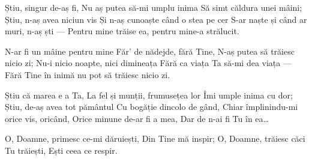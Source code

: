 \beginverse
Știu, singur de-aș fi,
Nu aș putea să-mi umplu inima
Să simt căldura unei mâini;
Știu, n-aș avea niciun vis
Și n-aș cunoaște când o stea pe cer
S-ar naște și când ar muri, n-aș ști —
Pentru mine trăise ea, pentru mine-a strălucit.
\endverse

\beginchorus
N-ar fi un mâine pentru mine
Făr’ de nădejde, fără Tine,
N-aș putea să trăiesc nicio zi;
Nu-i nicio noapte, nici dimineața
Fără ca viața Ta să-mi dea viața —
Fără Tine în inimă nu pot să trăiesc nicio zi.
\endchorus

\beginverse
Știu că marea e a Ta,
La fel și munții, frumusețea lor
Îmi umple inima cu dor;
Știu, de-aș avea tot pământul
Cu bogăție dincolo de gând,
Chiar împlinindu-mi orice vis, oricând,
Orice minune de-ar fi a mea,
Dar de n-ai fi Tu în ea…
\endverse

\beginverse*
O, Doamne, primesc ce-mi dăruiești,
Din Tine mă inspir;
O, Doamne, trăiesc căci Tu trăiești,
Ești ceea ce respir.
\endverse
\endsong